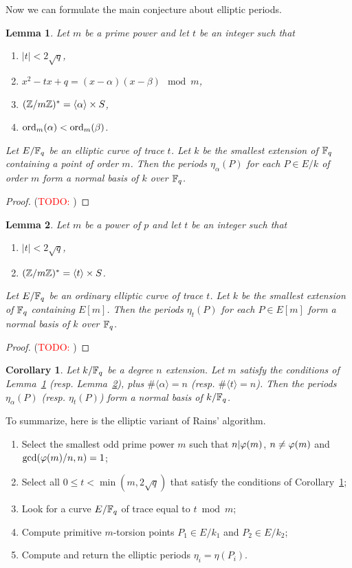 \documentclass{article}
\newcommand{\todo}[1]{(\textcolor{red}{TODO: #1})}
\newtheorem{Lemma}{Lemma}
\newtheorem{Coro}{Corollary}
\begin{document}
Now we can formulate the main conjecture about elliptic periods.

\begin{Lemma}
  \label{th:elliptic-periods}
  Let $m$ be a prime power and let $t$ be an integer such that
  \begin{enumerate}
  \item $|t|<2\sqrt{q}$,
  \item $x^2-tx+q = (x-\alpha)(x-\beta) \mod m$,
  \item $(\mathbb{Z}/m\mathbb{Z})^\ast = \langle\alpha\rangle \times S$,
  \item $\operatorname{ord}_m(\alpha)<\operatorname{ord}_m(\beta)$.
  \end{enumerate}
  Let $E/\mathbb{F}_q$ be an elliptic curve of trace $t$. Let $k$ be the
  smallest extension of $\mathbb{F}_q$ containing a point of order $m$. Then
  the periods $\eta_\alpha(P)$ for each $P\in E/k$ of order $m$ form a
  normal basis of $k$ over $\mathbb{F}_q$.
\end{Lemma}
\begin{proof}
  \todo{}
\end{proof}

\begin{Lemma}
  \label{th:elliptic-periods-p}
  Let $m$ be a power of $p$ and let $t$ be an integer such that
  \begin{enumerate}
  \item $|t|<2\sqrt{q}$,
  \item $(\mathbb{Z}/m\mathbb{Z})^\ast = \langle t\rangle \times S$.
  \end{enumerate}
  Let $E/\mathbb{F}_q$ be an ordinary elliptic curve of trace $t$. Let $k$ be
  the smallest extension of $\mathbb{F}_q$ containing $E[m]$. Then the periods
  $\eta_t(P)$ for each $P\in E[m]$ form a normal basis of $k$ over
  $\mathbb{F}_q$.
\end{Lemma}
\begin{proof}
  \todo{}
\end{proof}

\begin{Coro}
  \label{th:elliptic-rains}
  Let $k/\mathbb{F}_q$ be a degree $n$ extension. Let $m$ satisfy the
  conditions of Lemma~\ref{th:elliptic-periods}
  (resp. Lemma~\ref{th:elliptic-periods-p}), plus $\#\langle
  \alpha\rangle = n$ (resp. $\#\langle t\rangle=n$).  Then the periods
  $\eta_\alpha(P)$ (resp. $\eta_t(P)$) form a normal basis of
  $k/\mathbb{F}_q$.
\end{Coro}

To summarize, here is the elliptic variant of Rains' algorithm.

\begin{enumerate}
\item Select the smallest odd prime power $m$ such that $n|\varphi(m)$,
  $n\ne\varphi(m)$ and $\gcd(\varphi(m)/n,n)=1$;
\item Select all $0\le t<\min(m,2\sqrt{q})$ that satisfy the conditions
  of Corollary~\ref{th:elliptic-rains};
\item Look for a curve $E/\mathbb{F}_q$ of trace equal to $t\bmod m$;
\item Compute primitive $m$-torsion points $P_1\in E/k_1$ and
  $P_2\in E/k_2$;
\item Compute and return the elliptic periods $\eta_i=\eta(P_i)$.
\end{enumerate}
\end{document}
